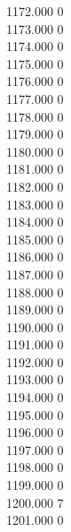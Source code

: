 { 1172.000	0 \\
 1173.000	0 \\
 1174.000	0 \\
 1175.000	0 \\
 1176.000	0 \\
 1177.000	0 \\
 1178.000	0 \\
 1179.000	0 \\
 1180.000	0 \\
 1181.000	0 \\
 1182.000	0 \\
 1183.000	0 \\
 1184.000	0 \\
 1185.000	0 \\
 1186.000	0 \\
 1187.000	0 \\
 1188.000	0 \\
 1189.000	0 \\
 1190.000	0 \\
 1191.000	0 \\
 1192.000	0 \\
 1193.000	0 \\
 1194.000	0 \\
 1195.000	0 \\
 1196.000	0 \\
 1197.000	0 \\
 1198.000	0 \\
 1199.000	0 \\
 1200.000	7 \\
 1201.000	0 \\
}
